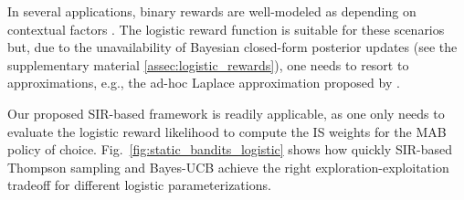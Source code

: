 \documentclass{article}
\newcommand{\eg}{e.g., }
\def\addappendix{}
\begin{document}
In several applications, binary rewards are well-modeled as depending on contextual factors \cite{ic-Chapelle2011,j-Scott2015}. The logistic reward function is suitable for these scenarios but, due to the unavailability of Bayesian closed-form posterior updates (see \ifx\addappendix\undefined the supplementary material \else \autoref{assec:logistic_rewards}\fi), one needs to resort to approximations, \eg the ad-hoc Laplace approximation proposed by \citet{ic-Chapelle2011}. 

Our proposed SIR-based framework is readily applicable, as one only needs to evaluate the logistic reward likelihood to compute the IS weights for the MAB policy of choice. Fig.~\ref{fig:static_bandits_logistic} shows how quickly SIR-based Thompson sampling and Bayes-UCB achieve the right exploration-exploitation tradeoff for different logistic parameterizations.
\end{document}

